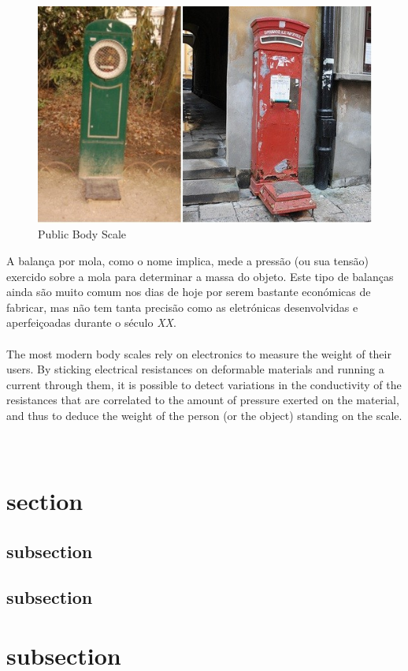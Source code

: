 \begin{figure}[H]
	\centering
	\includegraphics[scale=0.9]{./image/PESTA/general/public_body_scales_1.jpg}
	\caption{Public Body Scale}
	\label{public_body_scale_1}
\end{figure}
A balança por mola, como o nome implica, mede a pressão (ou sua tensão) exercido sobre a mola para determinar a massa do objeto. Este tipo de balanças ainda são muito comum nos dias de hoje por serem bastante económicas de fabricar, mas não tem tanta precisão como as eletrónicas desenvolvidas e aperfeiçoadas durante o século \textit{XX}.
\\
\\
The most modern body scales rely on electronics to measure the weight of their users. By sticking electrical resistances on deformable materials and running a current through them, it is possible to detect variations in the conductivity of the resistances that are correlated to the amount of pressure exerted on the material, and thus to deduce the weight of the person (or the object) standing on the scale.
\\
\\
\\
\section{section}
\subsection{subsection}
\subsection{subsection}
\section{subsection}
